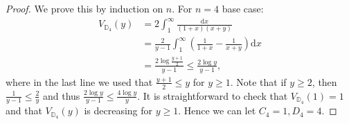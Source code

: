 \documentclass{amsart}
\newcommand{\DD}{\mathbb{D}}
\theoremstyle{definition}
\begin{document}
\begin{proof}
We prove this by induction on $n$. For $n=4$ base case:
\begin{equation}
\begin{split}
V_{\DD_4}(y) & =  2\int_1^\infty\frac{\mathrm{d}x}{(1+x)(x+y)} \\&= \frac{2}{y-1}\int_1^\infty \left(\frac{1}{1+x}-\frac{1}{x+y}\right)\mathrm{d}x \\&= \frac{2\log\frac{y+1}2{}}{y-1} \leqslant \frac{2\log y}{y-1},
\end{split}
\end{equation}
where in the last line we used that $\frac{y+1}{2}\leqslant y$ for $y\geqslant1$. Note that if $y\geqslant 2$, then $\frac{1}{y-1}\leqslant \frac{2}{y}$ and thus $\frac{2\log y}{y-1}\leqslant \frac{4\log y}{y}$. It is straightforward to check that $V_{\DD_4}(1)=1$ and that $V_{\DD_4}(y)$ is decreasing for $y\geqslant1$. Hence we can let $C_4=1,D_4=4$.


\end{proof}
\end{document}
